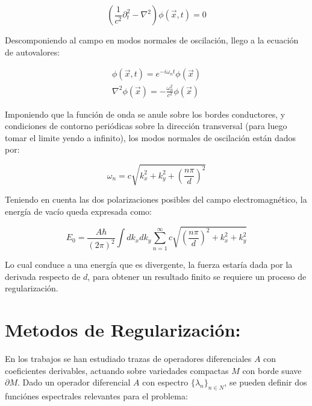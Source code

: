 \begin{equation}
( \frac{1}{c^2} \partial _t ^2 - \nabla  ^2  ) \phi (\vec{x} ,t) = 0 
\end{equation}

Descomponiendo al campo en modos normales de oscilación, llego a la ecuación de autovalores:

\begin{equation}
\begin{array}{c}
\phi ( \vec{x},t) = e ^{-i \omega _n t} \phi ( \vec{x}) \\
\nabla ^2 \phi ( \vec{x}) = - \frac{\omega _n ^2}{c ^2} \phi ( \vec{x})
\end{array}
\end{equation}

Imponiendo que la función de onda se anule sobre los bordes conductores, y condiciones de contorno periódicas sobre la dirección transversal (para luego tomar el limite yendo a infinito), los modos normales de oscilación están dados por:

\begin{equation}
\omega _n = c \sqrt{ k _x ^2 + k _y ^2 + \left( \frac{n \pi}{d} \right) ^2 }
\end{equation}

Teniendo en cuenta las dos polarizaciones posibles del campo electromagnético, la energía de vacío queda expresada como:

\begin{equation}
E _0 = \frac{A \hbar }{(2 \pi) ^2} \int dk _x dk _y 
\sum _{n=1} ^{\infty} 
c
\sqrt{
		\left( \frac{n \pi}{d} \right) ^2 + k _x ^2 + k _y ^2
		}
\end{equation}


Lo cual conduce a una energía que es divergente, la fuerza estaría dada por la derivada respecto de $d$, para obtener un resultado finito se requiere un proceso de regularización.

\section{Metodos de Regularización:}


En los trabajos \cite{ Seeley:1967ea,10.2307/2373309,10.2307/2373312} se han estudiado trazas de operadores diferenciales $A$ con coeficientes derivables, actuando sobre variedades compactas $M$ con borde suave $\partial M$. Dado un operador diferencial $A$ con espectro $ \{ \lambda _n \} _{n \in N}$, se pueden definir dos funciónes espectrales relevantes para el problema: \\


